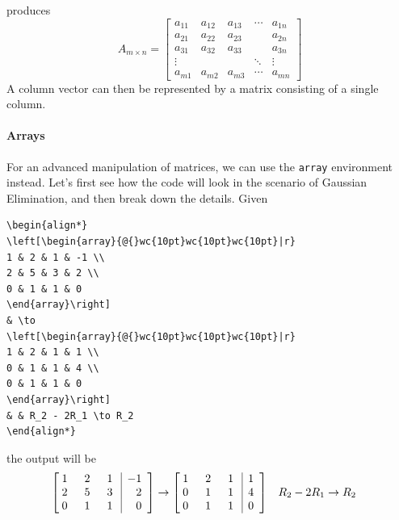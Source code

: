 produces
\begin{equation*}
A_{m \times n} = 
\begin{bmatrix}
a_{11} & a_{12} & a_{13} & \cdots & a_{1n} \\
a_{21} & a_{22} & a_{23} &        & a_{2n} \\
a_{31} & a_{32} & a_{33} &        & a_{3n} \\
\vdots &        &        & \ddots & \vdots \\
a_{m1} & a_{m2} & a_{m3} & \cdots & a_{mn}
\end{bmatrix}
\end{equation*}
A column vector can then be represented by a matrix consisting of a single column.

\paragraph{Arrays}
For an advanced manipulation of matrices, we can use the \verb|array| environment instead. Let's first see how the code will look in the scenario of Gaussian Elimination, and then break down the details. Given
\begin{lstlisting}
\begin{align*}
\left[\begin{array}{@{}wc{10pt}wc{10pt}wc{10pt}|r}
1 & 2 & 1 & -1 \\
2 & 5 & 3 & 2 \\
0 & 1 & 1 & 0
\end{array}\right] 
& \to 
\left[\begin{array}{@{}wc{10pt}wc{10pt}wc{10pt}|r}
1 & 2 & 1 & 1 \\
0 & 1 & 1 & 4 \\
0 & 1 & 1 & 0
\end{array}\right] 
& & R_2 - 2R_1 \to R_2
\end{align*}
\end{lstlisting}
the output will be
\begin{align*}
\left[\begin{array}{@{}wc{10pt}wc{10pt}wc{10pt}|r}
1 & 2 & 1 & -1 \\
2 & 5 & 3 & 2 \\
0 & 1 & 1 & 0
\end{array}\right] 
& \to 
\left[\begin{array}{@{}wc{10pt}wc{10pt}wc{10pt}|r}
1 & 2 & 1 & 1 \\
0 & 1 & 1 & 4 \\
0 & 1 & 1 & 0
\end{array}\right] 
& & R_2 - 2R_1 \to R_2
\end{align*}
